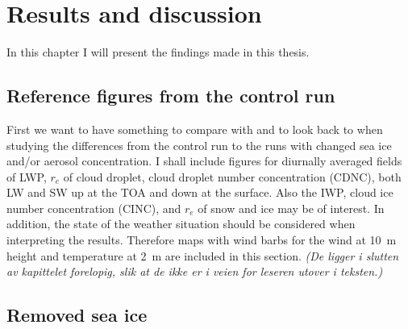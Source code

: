 \chapter{Results and discussion}
\label{chap:results}
In this chapter I will present the findings made in this thesis. 

\section{Reference figures from the control run}
First we want to have something to compare with and to look back to when studying the differences from the control run to the runs with changed sea ice and/or aerosol concentration. I shall include figures for diurnally averaged fields of LWP, $r_e$ of cloud droplet, cloud droplet number concentration (CDNC), both LW and SW up at the TOA and down at the surface. Also the IWP, cloud ice number concentration (CINC), and $r_e$ of snow and ice may be of interest. In addition, the state of the weather situation should be considered when interpreting the results. Therefore maps with wind barbs for the wind at 10~m height and temperature at 2~m are included in this section. \textit{(De ligger i slutten av kapittelet forelopig, slik at de ikke er i veien for leseren utover i teksten.)}	

\section{Removed sea ice}
